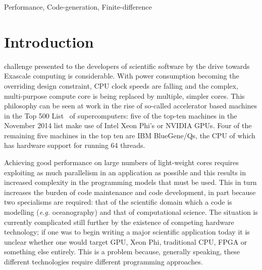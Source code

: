 \documentclass[journal]{IEEEtran}
\begin{document}
\begin{IEEEkeywords}
Performance, Code-generation, Finite-difference
\end{IEEEkeywords}


%
\IEEEpeerreviewmaketitle


\section{Introduction}
% 
% 
% 
% 
 challenge presented to the developers of
scientific software by the drive towards Exascale computing is
considerable. With power consumption becoming the overriding design
constraint, CPU clock speeds are falling and the complex,
multi-purpose compute core is being replaced by multiple, simpler
cores. This philosophy can be seen at work in the rise of so-called
accelerator based machines in the Top 500 List~\cite{top500} of
supercomputers: five of the top-ten machines in the November 2014 list
make use of Intel Xeon Phi's or NVIDIA GPUs. Four of the remaining
five machines in the top ten are IBM BlueGene/Qs, the CPU of which has
hardware support for running 64 threads.

Achieving good performance on large numbers of light-weight cores
requires exploiting as much parallelism in an application as possible
and this results in increased complexity in the programming models
that must be used. This in turn increases the burden of code
maintenance and code development, in part because two specialisms are
required: that of the scientific domain which a code is modelling
({\it e.g.} oceanography) and that of computational science. The
situation is currently complicated still further by the existence of
competing hardware technology; if one was to begin writing a major
scientific application today it is unclear whether one would target
GPU, Xeon Phi, traditional CPU, FPGA or something else entirely. This
is a problem because, generally speaking, these different technologies
require different programming approaches.
\end{document}
